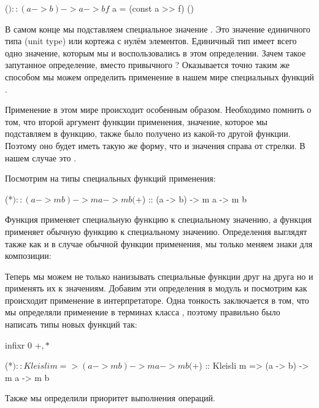 \begin{code}
($) :: (a -> b) -> a -> b
f $ a = (const a >> f) ()
\end{code}

В самом конце мы подставляем специальное значение \In{()}.
Это значение единичного типа (unit type) или кортежа с нулём элементов.
Единичный тип имеет всего одно значение, которым мы и 
воспользовались в этом определении.
Зачем такое запутанное определение, вместо привычного ?
Оказывается точно таким же способом мы можем определить 
применение в нашем мире специальных функций .

Применение в этом мире происходит особенным образом.
Необходимо помнить о том, что второй аргумент функции применения,
значение, которое мы подставляем в функцию, также было получено 
из какой-то другой функции. Поэтому оно будет иметь такую же
форму, что и значения справа от стрелки. В нашем случае 
это \mbox{}.

Посмотрим на типы специальных функций применения:

\begin{code}
(*$) :: (a -> m b) -> m a -> m b
(+$) :: (a -> b)   -> m a -> m b
\end{code}

Функция \In{*$} применяет специальную функцию к специальному
значению, а функция \In{+$} применяет обычную функцию к 
специальному значению. Определения выглядят также как 
и в случае обычной функции применения, мы только меняем
знаки для композиции:


Теперь мы можем не только нанизывать специальные функции
друг на друга но и применять их к значениям. Добавим
эти определения в модуль  и посмотрим 
как происходит применение в интерпретаторе. Одна тонкость
заключается в том, что мы определяли применение в терминах
класса , поэтому правильно было написать типы 
новых функций так:

\begin{code}
infixr 0 +$, *$

(*$) :: Kleisli m => (a -> m b) -> m a -> m b
(+$) :: Kleisli m => (a -> b)   -> m a -> m b
\end{code}

Также мы определили приоритет выполнения операций.

